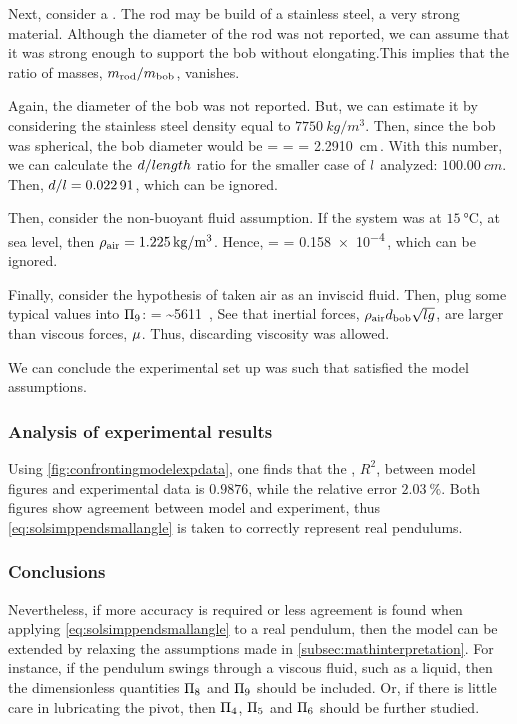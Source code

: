 Next, consider a . The rod may be build of a stainless steel, a very strong material. Although the diameter of the rod was not reported, we can assume that it was strong enough to support the bob without elongating.This implies that the ratio of masses, $m_\text{rod}/m_\text{bob}$, vanishes.

Again, the diameter of the bob was not reported. But, we can estimate it by considering the stainless steel density equal to $\SI{7750}{kg/m^3}$. Then, since the bob was spherical, the bob diameter would be
\beq
\diam = 
      = 
      = \SI{2.2910}{cm}\,.
\eeq
With this number, we can calculate the $d/length$ ratio for the smaller case of $l$ analyzed: $\SI{100.00}{cm}$. Then, $d/l = \num{0.02291}$, which can be ignored.

Then, consider the non-buoyant fluid assumption. If the system was at $\SI{15}{\celsius}$, at sea level, then $\rho_\text{air} = \SI{1.225}{kg/m^3}$. Hence, 
\beq
{} =  
                                         = \num{0.158e-4}\,, 
\eeq
which can be ignored.

Finally, consider the hypothesis of taken air as an inviscid fluid. Then, plug some typical values into $\Pi_9$:
\beq
{}
    = 
    \sim \num{5611} \,,
\eeq
See that inertial forces, $\rho_\text{air}d_\text{bob}\sqrt{lg}$, are larger than viscous forces, $\mu$. Thus, discarding viscosity was allowed.

We can conclude the experimental set up was such that satisfied the model assumptions.

\subsubsection{Analysis of experimental results}
Using \cref{fig:confrontingmodelexpdata}, one finds that the , $R^2$, between model figures and experimental data is $\num{0.9876}$, while the relative error $\SI{2.03}{\%}$. Both figures show agreement between model and experiment, thus \cref{eq:solsimppendsmallangle} is taken to correctly represent real pendulums.


\subsubsection{Conclusions}
Nevertheless, if more accuracy is required or less agreement is found when applying \cref{eq:solsimppendsmallangle} to a real pendulum, then the model can be extended by relaxing the assumptions made in \cref{subsec:mathinterpretation}. For instance, if the pendulum swings through a viscous fluid, such as a liquid, then the dimensionless quantities $\Pi_8$ and $\Pi_9$ should be included. Or, if there is little care in lubricating the pivot, then $\Pi_4$, $\Pi_5$ and $\Pi_6$ should be further studied.
